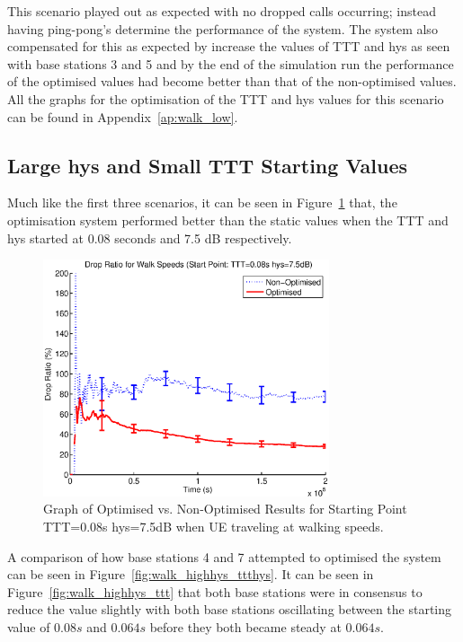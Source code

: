 This scenario played out as expected with no dropped calls occurring; instead having ping-pong’s determine the performance of the system. The system also compensated for this as expected by increase the values of TTT and hys as seen with base stations 3 and 5 and by the end of the simulation run the performance of the optimised values had become better than that of the non-optimised values. All the graphs for the optimisation of the TTT and hys values for this scenario can be found in Appendix~\ref{ap:walk_low}.
\subsection{Large hys and Small TTT Starting Values}
Much like the first three scenarios, it can be seen in Figure~\ref{fig:walk_highhys_drop} that, the optimisation system performed better than the static values when the TTT and hys started at 0.08 seconds and 7.5 dB respectively.
\begin{figure}[H]
  \begin{center}
    	  \includegraphics[width=0.75\textwidth]{figures/walking_figures/walkhighhys.eps}
    \end{center}
    \caption{Graph of Optimised vs. Non-Optimised Results for Starting Point TTT=0.08s hys=7.5dB when UE traveling at walking speeds.}
    \label{fig:walk_highhys_drop}
\end{figure}
A comparison of how base stations 4 and 7 attempted to optimised the system can be seen in Figure~\ref{fig:walk_highhys_ttthys}. It can be seen in Figure~\ref{fig:walk_highhys_ttt} that both base stations were in consensus to reduce the value slightly with both base stations oscillating between the starting value of $0.08 s$ and $0.064 s$ before they both became steady at $0.064 s$.

